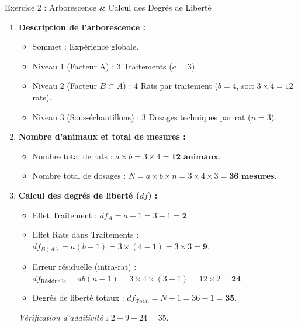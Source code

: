 \documentclass[11pt,a4paper]{article}
\begin{document}
\begin{solutionbox}{Exercice 2 : Arborescence \& Calcul des Degrés de Liberté}
\begin{enumerate}[label=\textbf{\alph*.}]
  \item \textbf{Description de l'arborescence :}
  \begin{itemize}
    \item Sommet : Expérience globale.
    \item Niveau 1 (Facteur A) : 3 Traitements ($a = 3$).
    \item Niveau 2 (Facteur $B \subset A$) : 4 Rats par traitement ($b = 4$, soit $3 \times 4 = 12$ rats).
    \item Niveau 3 (Sous-échantillons) : 3 Dosages techniques par rat ($n = 3$).
  \end{itemize}

  \item \textbf{Nombre d'animaux et total de mesures :}
  \begin{itemize}
    \item Nombre total de rats : $a \times b = 3 \times 4 = \mathbf{12\text{ animaux}}$.
    \item Nombre total de dosages : $N = a \times b \times n = 3 \times 4 \times 3 = \mathbf{36\text{ mesures}}$.
  \end{itemize}

  \item \textbf{Calcul des degrés de liberté ($df$) :}
  \begin{itemize}
    \item Effet Traitement : $df_A = a - 1 = 3 - 1 = \mathbf{2}$.
    \item Effet Rats dans Traitements : $df_{B(A)} = a(b - 1) = 3 \times (4 - 1) = 3 \times 3 = \mathbf{9}$.
    \item Erreur résiduelle (intra-rat) : $df_{\text{Résiduelle}} = ab(n - 1) = 3 \times 4 \times (3 - 1) = 12 \times 2 = \mathbf{24}$.
    \item Degrés de liberté totaux : $df_{\text{Total}} = N - 1 = 36 - 1 = \mathbf{35}$.
  \end{itemize}
  \textit{Vérification d'additivité :} $2 + 9 + 24 = 35$.
\end{enumerate}
\end{solutionbox}
\end{document}
